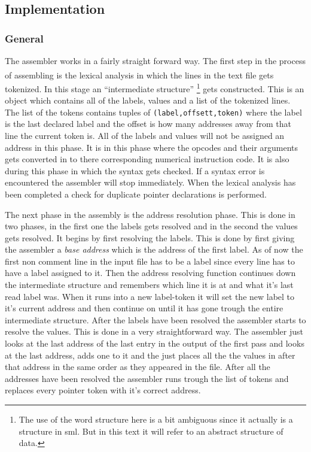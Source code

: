 \documentclass{article}
\begin{document}
\subsection{Implementation}
\subsubsection{General}
The assembler works in a fairly straight forward way. The first step in the
process of assembling is the lexical
analysis\textsuperscript{\cite{lexi}} in which the lines in the text file gets
tokenized. In this stage an ``intermediate structure'' \footnote{The use of the word structure here is a bit ambiguous since it
actually is a structure in sml. But in this text it will refer to an abstract
structure of data.} gets constructed.
This is an object which contains all of the labels, values and a list of the
tokenized lines. The list of the tokens contains tuples of
\verb+(label,offsett,token)+ where the label is the last declared label and
the offset is how many addresses away from that line the current token is. All
of the labels and values will not be assigned an address in this phase. It is in
this phase where the opcodes and their arguments gets converted in to there
corresponding numerical instruction code. It is also during this phase in which
the syntax gets checked. If a syntax error is encountered the assembler will
stop immediately. When the lexical analysis has been completed a check for
duplicate pointer declarations is performed.

The next phase in the assembly is the address resolution phase. This is done in
two phases, in the first one the labels gets resolved and in the second the
values gets  resolved. It begins by first resolving the labels.
This is done by first giving the assembler a \emph{base address} which is
the address of the first label. As of now the first
non comment line in the input file has to be a label since every line has to
have a label assigned to it. Then the address resolving function continues
down the intermediate structure and remembers which line it is at and what it's
last read label was. When it runs into a new label-token it will set the new
label to it's current address and then continue on until it has gone trough the entire
intermediate structure. After the labels have been resolved the assembler starts
to resolve the values. This is done in a very straightforward way. The assembler
just looks at the last address of the last entry in the output of the first
pass and looks at the last address, adds one to it and the just places all the
the values in after that address in the same order as they appeared in the file.
After all the addresses have been resolved the assembler runs trough the list
of tokens and replaces every pointer token with it's correct address.
\end{document}
